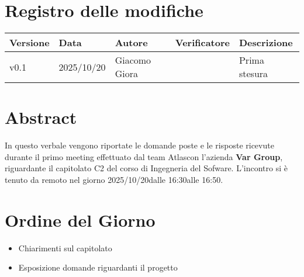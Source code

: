 \documentclass[a4paper,12pt]{article}
\newcommand{\Gruppo}{Atlas}
\newcommand{\DataVerbale}{2025/10/20}
\newcommand{\OraInizio}{16:30}
\newcommand{\OraFine}{16:50}
\newcommand{\AbstractVerbale}{%
In questo verbale vengono riportate le domande poste e le risposte ricevute durante il primo meeting effettuato dal team \Gruppo \space con l'azienda \textbf{Var Group}, riguardante il capitolato C2 del corso di Ingegneria del Sofware. L'incontro si è tenuto da remoto nel giorno \DataVerbale \space dalle \OraInizio \space alle \OraFine.
}
\newcommand{\VersioneVerbale}{v0.1} %
\begin{document}
\section*{Registro delle modifiche}{
    \begin{center} 
        \begin{tabular}{|l|l|l|l|l|}
            \hline
            \textbf{Versione} & \textbf{Data} & \textbf{Autore} & \textbf{Verificatore} & \textbf{Descrizione} \\
            \hline
            \VersioneVerbale & 2025/10/20 & Giacomo Giora &  & Prima stesura\\
            \hline
        \end{tabular}
    \end{center}
}

\newpage

\tableofcontents

\newpage
\section{Abstract}{
    \begin{minipage}{0.9\textwidth}
        \small
        \AbstractVerbale
    \end{minipage}
}


\section{Ordine del Giorno}{
    \begin{itemize}
        \item Chiarimenti sul capitolato
        \item Esposizione domande riguardanti il progetto
    \end{itemize}
}
\end{document}
